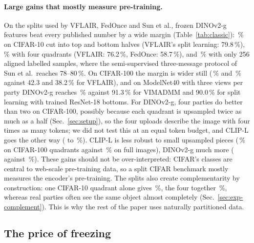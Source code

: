\paragraph{Large gains that mostly measure pre-training.}
On the splits used by VFLAIR, FedOnce and Sun et al., frozen DINOv2-g features beat every published number by a wide margin (Table~\ref{tab:classic}): \cTenGTwo\,\% on CIFAR-10 cut into top and bottom halves (VFLAIR's split learning: 79.8\,\%), \cTenGFour\,\% with four quadrants (VFLAIR: 76.2\,\%, FedOnce: 58.7\,\%), and \sunA\,\% with only 256 aligned labelled samples, where the semi-supervised three-message protocol of Sun et al.\ reaches 78--80\,\%. On CIFAR-100 the margin is wider still (\cHunGTwo\,\% and \cHunGFour\,\% against 42.3 and 38.2\,\% for VFLAIR), and on ModelNet40 with three views per party DINOv2-g reaches \mnGFour\,\% against 91.3\,\% for VIMADMM and 90.0\,\% for split learning with trained ResNet-18 bottoms. For DINOv2-g, four parties do better than two on CIFAR-100, possibly because each quadrant is upsampled twice as much as a half (Sec.~\ref{sec:setup}), so the four uploads describe the image with four times as many tokens; we did not test this at an equal token budget, and CLIP-L goes the other way (\cHunCTwo{} to \cHunCFour\,\%). CLIP-L is less robust to small upsampled pieces (\cHunCFour\,\% on CIFAR-100 quadrants against \cHunCCent\,\% on full images), DINOv2-g much more (\cHunGFour{} against \cHunGCent\,\%). These gains should not be over-interpreted: CIFAR's classes are central to web-scale pre-training data, so a split CIFAR benchmark mostly measures the encoder's pre-training. The splits also create complementarity by construction: one CIFAR-10 quadrant alone gives \cTenGSoloQ\,\%, the four together \cTenGFour\,\%, whereas real parties often see the same object almost completely (Sec.~\ref{sec:exp-complement}). This is why the rest of the paper uses naturally partitioned data.

\subsection{The price of freezing}\label{sec:exp-freeze}


